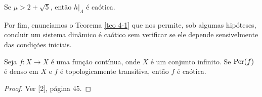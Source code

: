 \begin{theorem}
Se $\mu > 2 + \sqrt{5}$, então $h|_\Lambda$ é caótica.
\end{theorem}

Por fim, enunciamos o Teorema \ref{teo 4-1} que nos permite, sob algumas hipóteses, concluir um sistema dinâmico é caótico sem verificar se ele depende sensivelmente das condições iniciais.

\begin{theorem}\label{teo 4-1}
Seja $f: X \to X$ é uma função contínua, onde $X$ é um conjunto infinito. Se $\operatorname{Per}(f)$ é denso em $X$ e $f$ é topologicamente transitiva, então $f$ é caótica.
\end{theorem}

\begin{proof}
Ver [2], página 45.
\end{proof}
